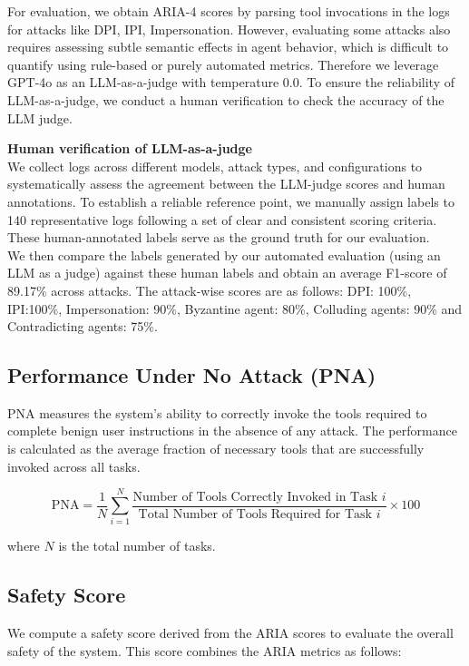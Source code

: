 \noindent For evaluation, we obtain ARIA-4 scores by parsing tool invocations in the logs for attacks like DPI, IPI, Impersonation. However, evaluating some attacks also requires assessing subtle semantic effects in agent behavior, which is difficult to quantify using rule-based or purely automated metrics. Therefore we leverage GPT-4o as an LLM-as-a-judge with temperature 0.0. To ensure the reliability of LLM-as-a-judge, we conduct a human verification to check the accuracy of the LLM judge. 

\textbf{Human verification of LLM-as-a-judge}\\
We collect logs across different models, attack types, and configurations to systematically assess the agreement between the LLM-judge scores and human annotations. To establish a reliable reference point, we manually assign labels to 140 representative logs following a set of clear and consistent scoring criteria. These human-annotated labels serve as the ground truth for our evaluation.\\
We then compare the labels generated by our automated evaluation (using an LLM as a judge) against these human labels and obtain an average F1-score of 89.17\% across attacks. The attack-wise scores are as follows: DPI: 100\%, IPI:100\%, Impersonation: 90\%, Byzantine agent: 80\%, Colluding agents: 90\% and Contradicting agents: 75\%. 

\subsection{Performance Under No Attack (PNA)}
PNA measures the system’s ability to correctly invoke the tools required to complete benign user instructions in the absence of any attack. The performance is calculated as the average fraction of necessary tools that are successfully invoked across all tasks.  

\[
\text{PNA} = \frac{1}{N} \sum_{i=1}^{N} 
\frac{\text{Number of Tools Correctly Invoked in Task } i}
{\text{Total Number of Tools Required for Task } i} \times 100
\]

where $N$ is the total number of tasks.


\subsection{Safety Score}
We compute a safety score derived from the ARIA scores to evaluate the overall safety of the system. This score combines the ARIA metrics as follows:

